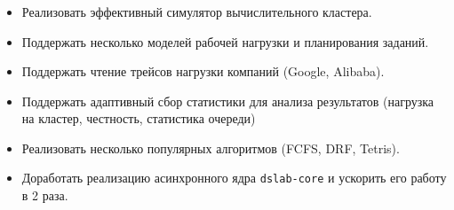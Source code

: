 \documentclass[t]{beamer}  %
\begin{document}
	\begin{frame}[fragile]
		\frametitle{\insertsection} 
		\framesubtitle{\insertsubsection}
		\small
		\hspace*{-0.5cm}
		\begin{minipage}{1.1\linewidth}
			{\centering
		\begin{itemize}
			\item<1->[\ding{51}] Реализовать эффективный симулятор вычислительного кластера.
			\item<2->[\ding{51}] Поддержать несколько моделей рабочей нагрузки и планирования заданий.
			\item<3->[\ding{51}] Поддержать чтение трейсов нагрузки компаний (Google, Alibaba).
			\item<4->[\ding{51}] Поддержать адаптивный сбор статистики для анализа результатов (нагрузка на кластер, честность, статистика очереди)
			\item<5->[\ding{51}] Реализовать несколько популярных алгоритмов (FCFS, DRF, Tetris).
			\item<6->[\ding{51}] Доработать реализацию асинхронного ядра \texttt{dslab-core} и ускорить его работу в 2 раза.
		\end{itemize}
			}
			\vspace{0.2cm}
			
	\end{minipage}

	\end{frame}

\end{document}
